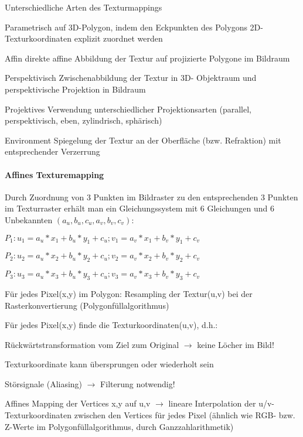\documentclass[landscape]{article}
\begin{document}
\begin{multicols}{3}
  Unterschiedliche Arten des Texturmappings
  \begin{description*}
    \item[Parametrisch] auf 3D-Polygon, indem den Eckpunkten des Polygons 2D-Texturkoordinaten explizit zuordnet werden
    \item[Affin] direkte affine Abbildung der Textur auf projizierte Polygone im Bildraum
    \item[Perspektivisch] Zwischenabbildung der Textur in 3D- Objektraum und perspektivische Projektion in Bildraum
    \item[Projektives] Verwendung unterschiedlicher Projektionsarten (parallel, perspektivisch, eben, zylindrisch, sphärisch)
    \item[Environment] Spiegelung der Textur an der Oberfläche (bzw. Refraktion) mit entsprechender Verzerrung
  \end{description*}
  
  \paragraph{Affines Texturemapping}
  Durch Zuordnung von 3 Punkten im Bildraster zu den entsprechenden 3 Punkten im Texturraster erhält man ein Gleichungssystem mit 6 Gleichungen und 6 Unbekannten $(a_u , b_u , c_u , a_v , b_v , c_v )$:
  \begin{itemize*}
    \item $P_1: u_1=a_u*x_1+b_u*y_1+c_u; v_1=a_v*x_1+b_v*y_1+c_v$
    \item $P_2: u_2=a_u*x_2+b_u*y_2+c_u; v_2=a_v*x_2+b_v*y_2+c_v$
    \item $P_3: u_3=a_u*x_3+b_u*y_3+c_u; v_3=a_v*x_3+b_v*y_3+c_v$
  \end{itemize*}
  
  Für jedes Pixel(x,y) im Polygon: Resampling der Textur(u,v) bei der Rasterkonvertierung (Polygonfüllalgorithmus)
  
  Für jedes Pixel(x,y) finde die Texturkoordinaten(u,v), d.h.:
  \begin{itemize*}
    \item Rückwärtstransformation vom Ziel zum Original $\rightarrow$ keine Löcher im Bild!
    \item Texturkoordinate kann übersprungen oder wiederholt sein
    \item Störsignale (Aliasing) $\rightarrow$ Filterung notwendig!
  \end{itemize*}
  
  Affines Mapping der Vertices x,y auf u,v $\rightarrow$ lineare Interpolation der u/v-Texturkoordinaten zwischen den Vertices für jedes Pixel (ähnlich wie RGB- bzw. Z-Werte im Polygonfüllalgorithmus, durch Ganzzahlarithmetik)
  

\end{multicols}
\end{document}
